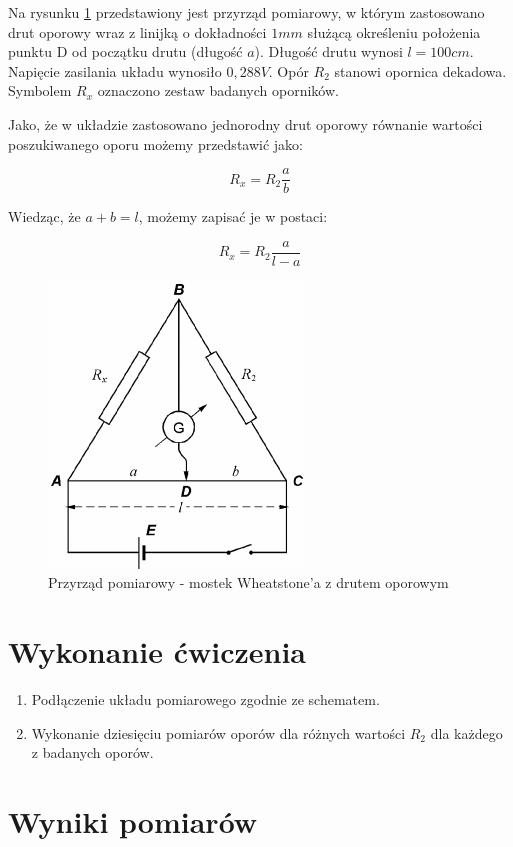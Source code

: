 \documentclass[a4paper,10pt,twoside]{article}
\begin{document}
Na rysunku \ref{fig:uklad} przedstawiony jest przyrząd pomiarowy, w którym zastosowano drut oporowy wraz z linijką o dokładności $1 \unit{mm}$ służącą określeniu położenia punktu D od początku drutu (długość $a$). Długość drutu wynosi $l = 100 \unit{cm}$. Napięcie zasilania układu wynosiło $0,288 \unit{V}$. Opór $R_2$ stanowi opornica dekadowa. Symbolem $R_x$ oznaczono zestaw badanych oporników.

Jako, że w układzie zastosowano jednorodny drut oporowy równanie wartości poszukiwanego oporu możemy przedstawić jako:

$$ R_x = R_2\frac{a}{b} $$

Wiedząc, że $a + b = l$, możemy zapisać je w postaci:

$$ R_x = R_2\frac{a}{l - a} $$

\begin{figure}[!htp]
\centerline{\includegraphics[scale=0.5]{uklad.png}}
\caption{Przyrząd pomiarowy - mostek Wheatstone'a z drutem oporowym}
\label{fig:uklad}
\end{figure}

\section{Wykonanie ćwiczenia}

\begin{enumerate}
  \item Podłączenie układu pomiarowego zgodnie ze schematem.
  \item Wykonanie dziesięciu pomiarów oporów dla różnych wartości $R_2$ dla każdego z badanych oporów.
\end{enumerate}

\section{Wyniki pomiarów}
\end{document}
